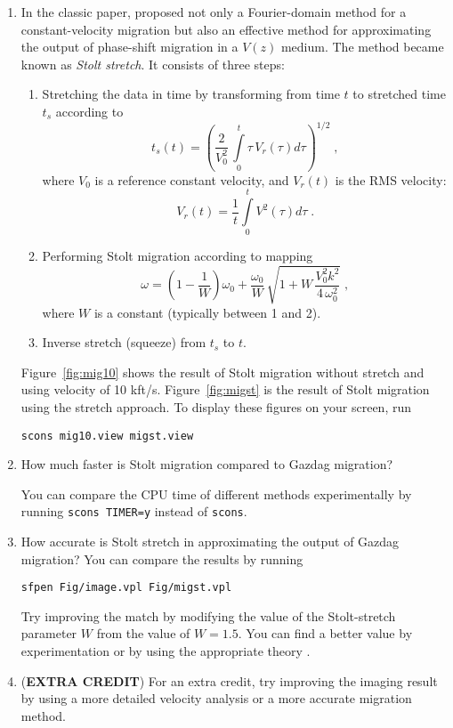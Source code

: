 \begin{enumerate}
\item In the classic paper, \cite{GEO50-11-22192244} proposed not only a Fourier-domain method for a constant-velocity migration but also an effective method for approximating the output of phase-shift migration in a $V(z)$ medium. The method became known as \emph{Stolt stretch}. It consists of three steps:
\begin{enumerate}
\item Stretching the data in time by transforming from time $t$ to stretched time $t_s$ according to
\begin{equation}
t_s(t)={\left(\frac{2}{V_0^2}\,\int\limits_0^t \tau\,V_r(\tau) d \tau\right)}^{1/2}\;,
\label{eqn:ss} 
\end{equation}
where $V_0$ is a reference constant velocity, and $V_r(t)$ is the RMS velocity:
\[ 
V_r(t) = \frac{1}{t} \int\limits_0^t V^2(\tau) d \tau\;.
\]
\item Performing Stolt migration according to mapping
\begin{equation}
\omega = 
\left(1-\frac{1}{W}\right) \omega_0+
\frac{\omega_0}{W}\,
\sqrt{1 + W\,\frac{V_0^2 k^2}{4\,\omega_0^2}}\;,
\label{eqn:sdispersion} 
\end{equation}
where $W$ is a constant (typically between 1 and 2).

\item Inverse stretch (squeeze) from $t_s$ to $t$.
\end{enumerate} 

Figure~\ref{fig:mig10} shows the result of Stolt migration without stretch and using velocity of 10 kft/s. Figure~\ref{fig:migst} is the result of Stolt migration using the stretch approach. To display these figures on your screen, run
\begin{verbatim}
scons mig10.view migst.view
\end{verbatim}

\item How much faster is Stolt migration compared to Gazdag migration? 

You can compare the CPU time of different methods experimentally by
running \texttt{scons TIMER=y} instead of \texttt{scons}.

\answer{
}

\item How accurate is Stolt stretch in approximating the output of Gazdag migration? You can compare the results by running
\begin{verbatim}
sfpen Fig/image.vpl Fig/migst.vpl
\end{verbatim}

Try improving the match by modifying the value of the Stolt-stretch parameter $W$ from the value of $W=1.5$. You can find a better value by experimentation or by using the appropriate theory \cite[]{stoltst}.

\item (\textbf{EXTRA CREDIT}) For an extra credit, try improving the imaging result by using a more detailed velocity analysis or a more accurate migration method.

\end{enumerate}

